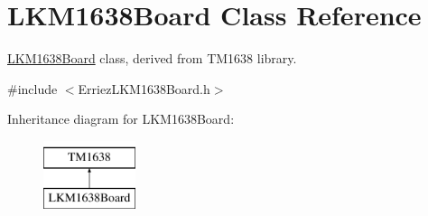 \hypertarget{class_l_k_m1638_board}{}\section{L\+K\+M1638\+Board Class Reference}
\label{class_l_k_m1638_board}


\hyperlink{class_l_k_m1638_board}{L\+K\+M1638\+Board} class, derived from T\+M1638 library.  




{\ttfamily \#include $<$Erriez\+L\+K\+M1638\+Board.\+h$>$}

Inheritance diagram for L\+K\+M1638\+Board\+:\begin{figure}[H]
\begin{center}
\leavevmode
\includegraphics[height=2.000000cm]{class_l_k_m1638_board}
\end{center}
\end{figure}
